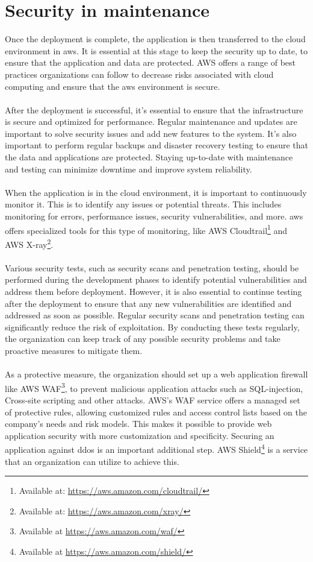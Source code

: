 \section{Security in maintenance}
Once the deployment is complete, the application is then transferred to the cloud environment in \acrlong{aws}. It is essential at this stage to keep the security up to date, to ensure that the application and data are protected. AWS offers a range of best practices organizations can follow to decrease risks associated with cloud computing and ensure that the  \acrshort{aws} environment is secure.
\\~\\
After the deployment is successful, it's essential to ensure that the infrastructure is secure and optimized for performance. Regular maintenance and updates are important to solve security issues and add new features to the system. It's also important to perform regular backups and disaster recovery testing to ensure that the data and applications are protected. 
Staying up-to-date with maintenance and testing can minimize downtime and improve system reliability. 
\\~\\
When the application is in the cloud environment, it is important to continuously monitor it. This is to identify any issues or potential threats. This includes monitoring for errors, performance issues, security vulnerabilities, and more. \acrshort{aws} offers specialized tools for this type of monitoring, like AWS Cloudtrail\footnote{Available at: \url{https://aws.amazon.com/cloudtrail/}} and AWS X-ray\footnote{Available at: \url{https://aws.amazon.com/xray/}}. 
\\~\\
Various security tests, such as security scans and penetration testing, should be performed during the development phases to identify potential vulnerabilities and address them before deployment. However, it is also essential to continue testing after the deployment to ensure that any new vulnerabilities are identified and addressed as soon as possible. Regular security scans and penetration testing can significantly reduce the risk of exploitation. By conducting these tests regularly, the organization can keep track of any possible security problems and take proactive measures to mitigate them.
\\~\\
As a protective measure, the organization should set up a web application firewall like AWS WAF\footnote{Available at \url{https://aws.amazon.com/waf/}}, to prevent malicious application attacks such as \gls{SQL-injection}, \gls{Cross-site scripting} and other attacks. AWS's WAF service offers a managed set of protective rules, allowing customized rules and access control lists based on the company's needs and risk models. This makes it possible to provide web application security with more customization and specificity. Securing an application against \gls{ddos} is an important additional step. AWS Shield\footnote{Available at \url{https://aws.amazon.com/shield/}} is a service that an organization can utilize to achieve this. \cite{awsafterdep}
